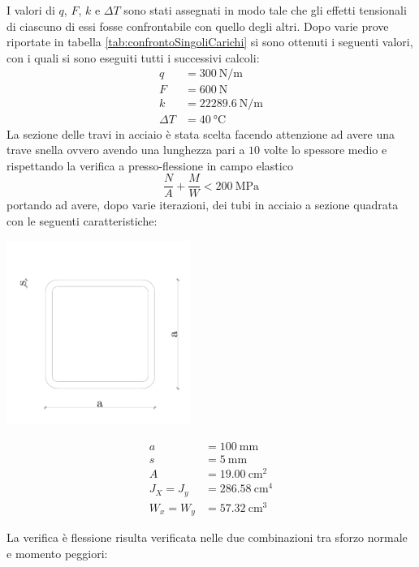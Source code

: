 I valori di $q$, $F$, $k$ e $\Delta T$ sono stati assegnati in modo tale che gli effetti  tensionali di ciascuno di essi fosse confrontabile con quello degli altri. 
Dopo varie prove riportate in tabella \ref{tab:confrontoSingoliCarichi} si sono ottenuti i seguenti valori, con i quali si sono eseguiti tutti i successivi calcoli:
\begin{align*}
	q &= \SI{300}{\newton \per \metre}\\
	F &= \SI{600}{\newton}\\
	k &= \SI{22289.6}{\newton \per \metre}\\
	\Delta T &= \SI{40}{\celsius}
\end{align*}
La sezione delle travi in acciaio è stata scelta facendo attenzione ad avere una trave snella ovvero avendo una lunghezza pari a $10$ volte lo spessore medio e rispettando la verifica a presso-flessione in campo elastico 
\[
\frac{N}{A} + \frac{M}{W} < \SI{200}{\mega\pascal}
\]
portando ad avere, dopo varie iterazioni, dei tubi in acciaio a sezione quadrata con le seguenti caratteristiche:
\begin{center}
\begin{minipage}{6cm}
	\includegraphics[width=60mm]{rel1/img1/tubi-quadri.pdf}
\end{minipage}
\begin{minipage}{6cm}
	\begin{align*}
		a &= \SI{100}{\milli\metre}\\
		s &= \SI{5}{\milli\metre}\\
		A &= \SI{19.00}{\centi\metre\squared}\\
		J_X = J_y &= \SI{286.58}{\centi\metre\tothe{4}}\\
		W_x = W_y &= \SI{57.32}{\centi\metre\cubed}
	\end{align*}
\end{minipage}
\end{center}
La verifica è flessione risulta verificata nelle due combinazioni tra sforzo normale e momento peggiori: 
